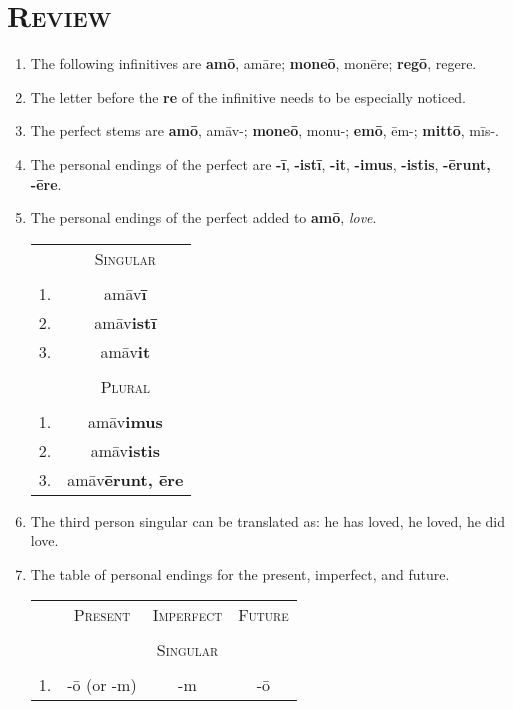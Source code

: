 \documentclass[12pt]{article}
\begin{document}
\section{\textsc{Review}}
\begin{enumerate}[1.]
	\item The following infinitives are \textbf{amō}, amāre; \textbf{moneō}, monēre; \textbf{regō}, regere.
	\item The letter before the \textbf{re} of the infinitive needs to be especially noticed.
	\item The perfect stems are \textbf{amō}, amāv-; \textbf{moneō}, monu-; \textbf{emō}, ēm-; \textbf{mittō}, mīs-.
	\item The personal endings of the perfect are \textbf{-ī}, \textbf{-istī}, \textbf{-it}, \textbf{-imus}, \textbf{-istis}, \textbf{-ērunt, -ēre}.
	\item The personal endings of the perfect added to \textbf{amō}, \textit{love}.
	\begin{center}
		\begin{tabular}{ c c }
		& \textsc{Singular} \\
		& \\
		\textsc{1}. & amāv\textbf{ī} \\
		\textsc{2}. & amāv\textbf{istī} \\
		\textsc{3}. & amāv\textbf{it} \\
		& \\
		& \textsc{Plural} \\
		& \\
		\textsc{1}. & amāv\textbf{imus} \\
		\textsc{2}. & amāv\textbf{istis} \\
		\textsc{3}. & amāv\textbf{ērunt, ēre}
		\end{tabular}
	\end{center}
	\item The third person singular can be translated as: he has loved, he loved, he did love.
	\item The table of personal endings for the present, imperfect, and future.
	\begin{center}
		\begin{tabular}{ c c c c }
		& \textsc{Present} & \textsc{Imperfect} & \textsc{Future} \\
		& & & \\
		& & \textsc{Singular} & \\
		& & & \\
		\textsc{1}. & -ō (or -m) & -m & -ō \\

\end{tabular}
\end{center}
\end{enumerate}
\end{document}
